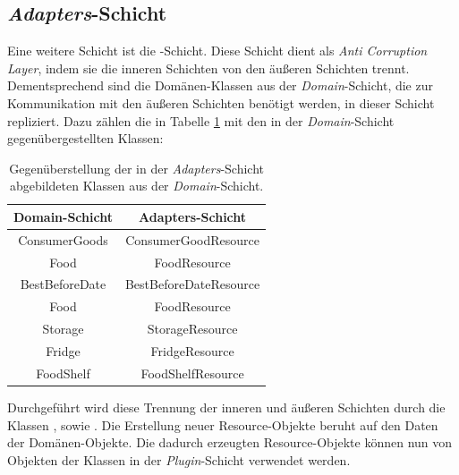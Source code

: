 
\subsection*{\textit{Adapters}-Schicht}
Eine weitere Schicht ist die \href{https://github.com/lucasmerkel/dhbw-advancedswe-programmentwurf/tree/main/swe_programmentwurf/consumergoods-inventory-planner/1-cip-adapters}{}-Schicht.
Diese Schicht dient als \textit{Anti Corruption Layer}, indem sie die inneren Schichten von den äußeren Schichten trennt.
Dementsprechend sind die Domänen-Klassen aus der \textit{Domain}-Schicht, die zur Kommunikation mit den äußeren Schichten benötigt werden, in dieser Schicht repliziert.
Dazu zählen die in Tabelle \ref{clean-architecture>klassen-adapters} mit den in der \textit{Domain}-Schicht gegenübergestellten Klassen:

\begin{table}[H]
    \centering
\begin{tabular}[h]{|c|c|}
	\hline
	\textbf{Domain-Schicht} & \textbf{Adapters-Schicht} \\
	\hline
	ConsumerGoods & ConsumerGoodResource \\
	\hline
	Food & FoodResource \\
	\hline
	BestBeforeDate & BestBeforeDateResource \\
	\hline
	Food & FoodResource \\
	\hline
	Storage & StorageResource \\
	\hline
	Fridge & FridgeResource \\
	\hline
	FoodShelf & FoodShelfResource \\
    \hline
\end{tabular}
    \caption{Gegenüberstellung der in der \textit{Adapters}-Schicht abgebildeten Klassen aus der \textit{Domain}-Schicht.}
    \label{clean-architecture>klassen-adapters}
\end{table}

Durchgeführt wird diese Trennung der inneren und äußeren Schichten durch die Klassen \href{https://github.com/lucasmerkel/dhbw-advancedswe-programmentwurf/blob/d5c89113d12c3b877ddc4d6a99225b277ddd468f/swe_programmentwurf/consumergoods-inventory-planner/1-cip-adapters/src/main/java/de/dhbw/cip/adapters/ConsumerGoodToConsumerGoodResourceMapper.java}{}, \href{https://github.com/lucasmerkel/dhbw-advancedswe-programmentwurf/blob/d5c89113d12c3b877ddc4d6a99225b277ddd468f/swe_programmentwurf/consumergoods-inventory-planner/1-cip-adapters/src/main/java/de/dhbw/cip/adapters/FridgeToFridgeResourceMapper.java}{} sowie \href{https://github.com/lucasmerkel/dhbw-advancedswe-programmentwurf/blob/d5c89113d12c3b877ddc4d6a99225b277ddd468f/swe_programmentwurf/consumergoods-inventory-planner/1-cip-adapters/src/main/java/de/dhbw/cip/adapters/FoodShelfToFoodShelfRessourceMapper.java}{}.
Die Erstellung neuer Resource-Objekte beruht auf den Daten der Domänen-Objekte.
Die dadurch erzeugten Resource-Objekte können nun von Objekten der Klassen in der \textit{Plugin}-Schicht verwendet werden.

